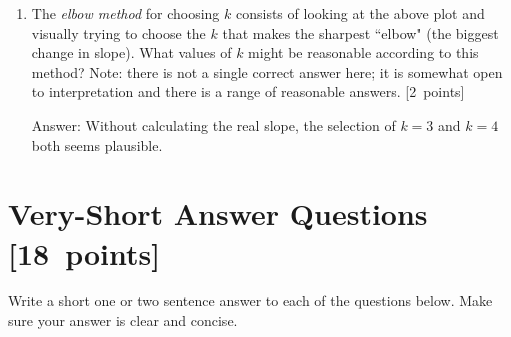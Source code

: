 \documentclass{article}
\newcommand{\blu}[1]{{\textcolor{blu}{#1}}}
\newenvironment{answer}{\par\begingroup\color{gre}Answer: }{\endgroup}
\let\ask\blu
\newcommand\pts[1]{\textcolor{pointscolour}{[#1~points]}}
\begin{document}
\begin{enumerate}
\begin{figure}
        \end{figure}
        \item The \emph{elbow method} for choosing $k$ consists of looking at the above plot and visually trying to choose the $k$ that makes the sharpest ``elbow" (the biggest change in slope). \ask{What values of $k$ might be reasonable according to this method?} Note: there is not a single correct answer here; it is somewhat open to interpretation and there is a range of reasonable answers. \pts{2}
        \begin{answer}
            Without calculating the real slope, the selection of $k = 3$ and $k = 4$ both seems plausible.
        \end{answer}
    \end{enumerate}

    \clearpage
    \section{Very-Short Answer Questions \pts{18}}

    \ask{Write a short one or two sentence answer to each of the questions below}. Make sure your answer is clear and concise.

  
\end{document}
